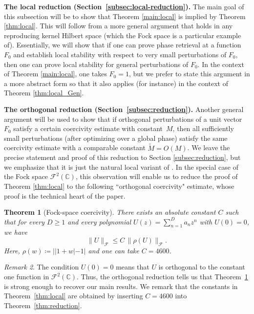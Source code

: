 \documentclass[11pt]{amsart}
\newtheorem{theorem}{Theorem}[section]
\theoremstyle{remark}
\newtheorem{remark}[theorem]{Remark}
\newcommand{\norm}[1]{\lVert #1 \rVert}
\begin{document}
\noindent\textbf{The local reduction
(Section~\ref{subsec:local-reduction}).}\;
The main goal of this subsection will be to show that Theorem \ref{main:local} is implied by Theorem \ref{thm:local}. This will follow from a more general argument that holds in any reproducing kernel Hilbert space (which the Fock space is a particular example of). Essentially, we will show that if one
can prove phase retrieval at a function \(F_0\) and establish local stability
with respect to very small perturbations of \(F_0\), then one can prove local
stability for general perturbations of \(F_0\). In the context of Theorem \ref{main:local}, one takes $F_0=1$, but we prefer to state this argument in a more abstract form so that it also applies (for instance) in the context of Theorem \ref{thm:local_Gen}. 
 \vspace{0.5em}

\noindent
\textbf{The orthogonal reduction (Section~\ref{subsec:reduction}).}\;
Another general argument will be used to show that if orthogonal perturbations
of a unit vector $F_0$ satisfy a certain coercivity estimate with constant~$M$,
then all sufficiently small perturbations (after optimizing over a global
phase) satisfy the same coercivity estimate with a comparable constant $\widetilde{M} = O(M)$. We leave the precise statement and proof of this reduction to Section \ref{subsec:reduction}, but we emphasize that it is just the natural local variant of \cite[Theorem 3.10]{MR4800909}. In the special case of the Fock space $\mathcal{F}^2(\mathbb{C})$, this observation will enable us to reduce the proof of Theorem
\ref{thm:local} to the following ``orthogonal
coercivity" estimate, whose proof is the technical heart of the paper.

\begin{theorem}[Fock-space coercivity]\label{thm:orthog}
There exists an absolute constant $C$ such that for every $D \ge 1$ and every polynomial
$U(z) = \sum_{n=1}^D a_n z^n$ with $U(0) = 0$, we have
\[
  \norm{U}_{\mathcal{F}} \le C\,\norm{\rho(U)}_{\mathcal{F}}.
\]
Here, $\rho(w)\coloneq ||1+w|-1|$ and one can take $C = 4600$.
\end{theorem}
\begin{remark}
  The condition $U(0) = 0$ means that $U$ is orthogonal to the constant one
function in $\mathcal{F}^2(\mathbb{C})$. Thus, the orthogonal reduction tells us that Theorem~\ref{thm:orthog} is strong enough to recover our main results. We  remark that the constants in Theorem~\ref{thm:local} are obtained by inserting $C=4600$ into Theorem~\ref{thm:reduction}.
\end{remark}
\end{document}
